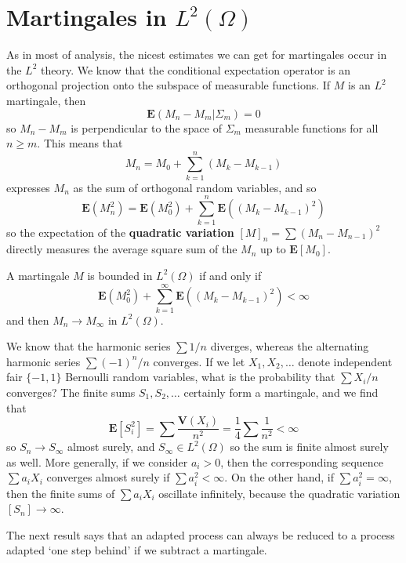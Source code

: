 \section{Martingales in $L^2(\Omega)$}

As in most of analysis, the nicest estimates we can get for martingales occur in the $L^2$ theory. We know that the conditional expectation operator is an orthogonal projection onto the subspace of measurable functions. If $M$ is an $L^2$ martingale, then
%
\[ \mathbf{E}(M_n - M_m | \Sigma_m) = 0 \]
%
so $M_n - M_m$ is perpendicular to the space of $\Sigma_m$ measurable functions for all $n \geq m$. This means that
%
\[ M_n = M_0 + \sum_{k = 1}^n (M_k - M_{k-1}) \]
%
expresses $M_n$ as the sum of orthogonal random variables, and so
%
\[ \mathbf{E}(M_n^2) = \mathbf{E}(M_0^2) + \sum_{k = 1}^n \mathbf{E}((M_k - M_{k-1})^2) \]
%
so the expectation of the {\bf quadratic variation} $[M]_n = \sum (M_n - M_{n-1})^2$ directly measures the average square sum of the $M_n$ up to $\mathbf{E}[M_0]$.

\begin{theorem}
    A martingale $M$ is bounded in $L^2(\Omega)$ if and only if
    \[ \mathbf{E}(M_0^2) + \sum_{k = 1}^\infty \mathbf{E}((M_k - M_{k-1})^2) < \infty \]
    and then $M_n \to M_\infty$ in $L^2(\Omega)$.
\end{theorem}

\begin{example}
    We know that the harmonic series $\sum 1/n$ diverges, whereas the alternating harmonic series $\sum (-1)^n/n$ converges. If we let $X_1, X_2, \dots$ denote independent fair $\{ -1, 1 \}$ Bernoulli random variables, what is the probability that $\sum X_i/n$ converges? The finite sums $S_1, S_2, \dots$ certainly form a martingale, and we find that
    \[ \mathbf{E}[S_i^2] = \sum \frac{\mathbf{V}(X_i)}{n^2} = \frac{1}{4} \sum \frac{1}{n^2} < \infty \]
    so $S_n \to S_\infty$ almost surely, and $S_\infty \in L^2(\Omega)$ so the sum is finite almost surely as well. More generally, if we consider $a_i > 0$, then the corresponding sequence $\sum a_iX_i$ converges almost surely if $\sum a_i^2 < \infty$. On the other hand, if $\sum a_i^2 = \infty$, then the finite sums of $\sum a_iX_i$ oscillate infinitely, because the quadratic variation $[S_n] \to \infty$.
\end{example}

The next result says that an adapted process can always be reduced to a process adapted `one step behind' if we subtract a martingale.

